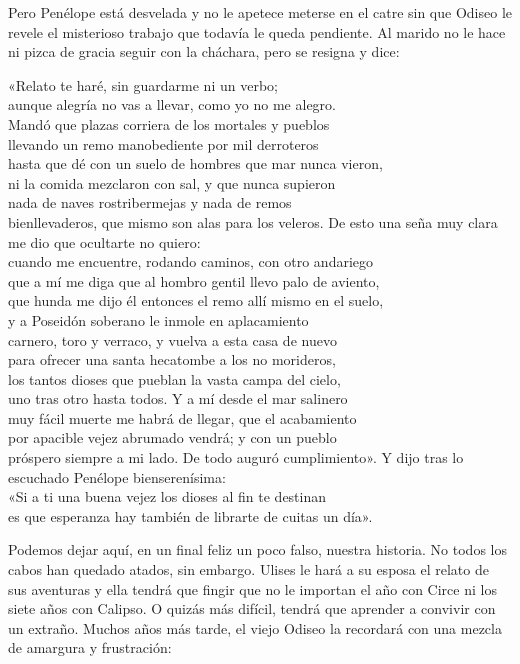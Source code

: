 Pero Penélope está desvelada y no le apetece meterse en el catre sin que Odiseo le revele el misterioso trabajo que todavía le queda pendiente. Al marido no le hace ni pizca de gracia seguir con la cháchara, pero se resigna y dice:

\begin{versocita}
«Relato te haré, sin guardarme ni un verbo;\\
aunque alegría no vas a llevar, como yo no me alegro.\\
Mandó que plazas corriera de los mortales y pueblos\\
llevando un remo manobediente por mil derroteros\\
hasta que dé con un suelo de hombres que mar nunca vieron,\\
ni la comida mezclaron con sal, y que nunca supieron\\
nada de naves rostribermejas y nada de remos\\
bienllevaderos, que mismo son alas para los veleros.
\stanzabreak
De esto una seña muy clara me dio que ocultarte no quiero:\\
cuando me encuentre, rodando caminos, con otro andariego\\
que a mí me diga que al hombro gentil llevo palo de aviento,\\
que hunda me dijo él entonces el remo allí mismo en el suelo,\\
y a Poseidón soberano le inmole en aplacamiento\\
carnero, toro y verraco, y vuelva a esta casa de nuevo\\
para ofrecer una santa hecatombe a los no morideros,\\
los tantos dioses que pueblan la vasta campa del cielo,\\
uno tras otro hasta todos. Y a mí desde el mar salinero\\
muy fácil muerte me habrá de llegar, que el acabamiento\\
por apacible vejez abrumado vendrá; y con un pueblo\\
próspero siempre a mi lado. De todo auguró cumplimiento».
\stanzabreak
Y dijo tras lo escuchado Penélope bienserenísima:\\
«Si a ti una buena vejez los dioses al fin te destinan\\
es que esperanza hay también de librarte de cuitas un día».
\end{versocita}

Podemos dejar aquí, en un final feliz un poco falso, nuestra historia. No todos los cabos han quedado atados, sin embargo. Ulises le hará a su esposa el relato de sus aventuras y ella tendrá que fingir que no le importan el año con Circe ni los siete años con Calipso. O quizás más difícil, tendrá que aprender a convivir con un extraño. Muchos años más tarde, el viejo Odiseo la recordará con una mezcla de amargura y frustración:


